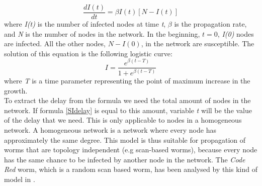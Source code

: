 \begin{equation}
\dfrac{d I(t)}{dt} = \beta I(t)[N-I(t)]
\end{equation} 
where \textit{I(t)} is the number of infected nodes at time \textit{t}, $\beta$ is the propagation rate, and \textit{N} is the number of nodes in the network. In the beginning, $t=0$, \textit{I(0)} nodes are infected. All the other nodes, $N - I(0)$, in the network are susceptible. 
The solution of this equation is the following logistic curve:
\begin{equation}
I = \dfrac{e^{\beta(t-T)}}{1+e^{\beta(t-T)}}
\label{SIdelay}
\end{equation}
where \textit{T} is a time parameter representing the point of maximum increase in the growth.\\



To extract the delay from the formula we need the total amount of nodes in the network. If formula \ref{SIdelay} is equal to this amount, variable \textit{t} will be the value of the delay that we need. This is only applicable to nodes in a homogeneous network. A homogeneous network is a network where every node has approximately the same degree. This model is thus suitable for propagation of worms that are topology independent (e.g scan-based worms), because every node has the same chance to be infected by another node in the network. The \textit{Code Red} worm, which is a random scan based worm, has been analysed by this kind of model in \cite{OwnInternetSI}.

